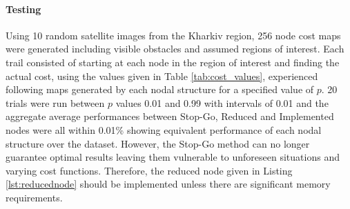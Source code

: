 \paragraph{Testing}
Using 10 random satellite images from the Kharkiv region, 256 node cost maps were generated including visible obstacles and assumed regions of interest. Each trail consisted of starting at each node in the region of interest and finding the actual cost, using the values given in Table \ref{tab:cost_values}, experienced following maps generated by each nodal structure for a specified value of $p$. 20 trials were run between $p$ values 0.01 and 0.99 with intervals of 0.01 and the aggregate average performances between Stop-Go, Reduced and Implemented nodes were all within 0.01\% showing equivalent performance of each nodal structure over the dataset. However, the Stop-Go method can no longer guarantee optimal results leaving them vulnerable to unforeseen situations and varying cost functions. Therefore, the reduced node given in Listing \ref{lst:reducednode} should be implemented unless there are significant memory requirements.


